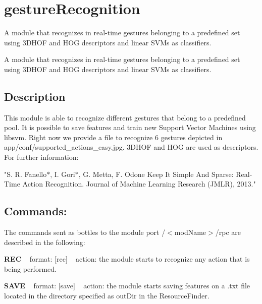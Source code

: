 \section{gesture\+Recognition}
\label{group__gestureRecognition}


A module that recognizes in real-\/time gestures belonging to a predefined set using 3\+D\+H\+OF and H\+OG descriptors and linear S\+V\+Ms as classifiers.  


A module that recognizes in real-\/time gestures belonging to a predefined set using 3\+D\+H\+OF and H\+OG descriptors and linear S\+V\+Ms as classifiers. 

\hypertarget{group__gestureRecognitionStereo_intro_sec}{}\subsection{Description}\label{group__gestureRecognitionStereo_intro_sec}
This module is able to recognize different gestures that belong to a predefined pool. It is possible to save features and train new Support Vector Machines using libsvm. Right now we provide a file to recognize 6 gestures depicted in app/conf/supported\+\_\+actions\+\_\+easy.\+jpg. 3\+D\+H\+OF and H\+OG are used as descriptors. For further information\+:

"S. R. Fanello$\ast$, I. Gori$\ast$, G. Metta, F. Odone Keep It Simple And Sparse\+: Real-\/\+Time Action Recognition. Journal of Machine Learning Research (J\+M\+LR), 2013."\hypertarget{group__gestureRecognitionStereo_rpc_port}{}\subsection{Commands\+:}\label{group__gestureRecognitionStereo_rpc_port}
The commands sent as bottles to the module port /$<$mod\+Name$>$/rpc are described in the following\+:

{\bfseries R\+EC} ~\newline
format\+: \mbox{[}rec\mbox{]} ~\newline
action\+: the module starts to recognize any action that is being performed.

{\bfseries S\+A\+VE} ~\newline
format\+: \mbox{[}save\mbox{]} ~\newline
action\+: the module starts saving features on a .txt file located in the directory specified as out\+Dir in the Resource\+Finder.

